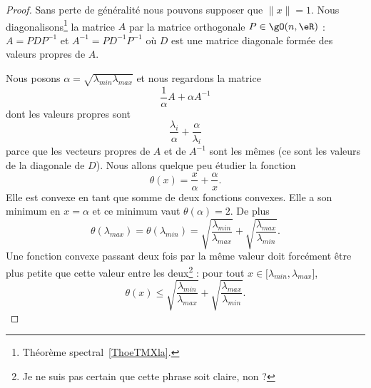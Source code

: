 \begin{proof}
	Sans perte de généralité nous pouvons supposer que \( \| x \|=1\). Nous diagonalisons\footnote{Théorème spectral~\ref{ThoeTMXla}.} la matrice \( A\) par la matrice orthogonale  \( P\in\gO(n,\eR)\) : \( A=PDP^{-1}\) et \( A^{-1}=PD^{-1}P^{-1}\) où \( D\) est  une matrice diagonale formée des valeurs propres de \( A\).

	Nous posons \( \alpha=\sqrt{\lambda_{min}\lambda_{max}}\) et nous regardons la matrice
	\begin{equation}
		\frac{1}{ \alpha }A+\alpha A^{-1}
	\end{equation}
	dont les valeurs propres sont
	\begin{equation}
		\frac{ \lambda_i }{ \alpha }+\frac{ \alpha }{ \lambda_i }
	\end{equation}
	parce que les vecteurs propres de \( A\) et de \( A^{-1}\) sont les mêmes (ce sont les valeurs de la diagonale de \( D\)). Nous allons quelque peu étudier la fonction
	\begin{equation}
		\theta(x)=\frac{ x }{ \alpha }+\frac{ \alpha }{ x }.
	\end{equation}
	Elle est convexe en tant que somme de deux fonctions convexes. Elle a son minimum en \( x=\alpha\) et ce minimum vaut \( \theta(\alpha)=2\). De plus
	\begin{equation}
		\theta(\lambda_{max})=\theta(\lambda_{min})=\sqrt{\frac{ \lambda_{min} }{ \lambda_{max} }}+\sqrt{\frac{ \lambda_{max} }{ \lambda_{min} }}.
	\end{equation}
	Une fonction convexe passant deux fois par la même valeur doit forcément être plus petite que cette valeur entre les deux\footnote{Je ne suis pas certain que cette phrase soit claire, non ?} : pour tout \( x\in\mathopen[ \lambda_{min} , \lambda_{max} \mathclose]\),
	\begin{equation}
		\theta(x)\leq  \sqrt{\frac{ \lambda_{min} }{ \lambda_{max} }}+\sqrt{\frac{ \lambda_{max} }{ \lambda_{min} }}.
	\end{equation}


\end{proof}
